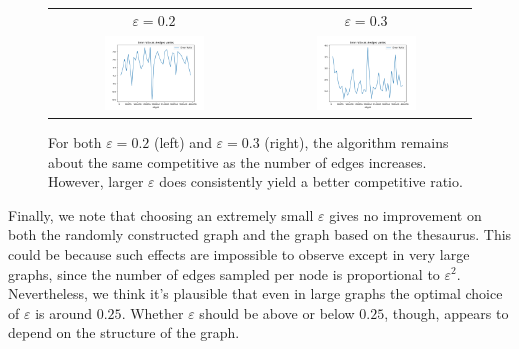 \documentclass[
]{article}
\begin{document}
\begin{figure}[!htb]
  \begin{tabular}{cc}
    {\(\varepsilon  = 0.2\)} & {\(\varepsilon = 0.3\)}                                           \\
    \includegraphics[width=0.5\textwidth]{images/error_ratio_as_edges_varies_eps_equals_0.2.png}
                             &
    \includegraphics[width=0.5\textwidth]{images/error_ratio_as_edges_varies_eps_equals_0.3.png} \\
  \end{tabular}
  \caption{\label{fig:error-ratio-as-edges-varies}
    For both $\varepsilon = 0.2$ (left) and $\varepsilon = 0.3$ (right), the
    algorithm remains about the same competitive as the number of edges
    increases. However, larger $\varepsilon$ does consistently yield
    a better competitive ratio.}
\end{figure}

Finally, we note that choosing an extremely small $\varepsilon$ gives no improvement
on both the randomly constructed graph and the graph based on the thesaurus. This could be
because such effects are impossible to observe except in very large graphs, since the number
of edges sampled per node is proportional to $\varepsilon^2$. Nevertheless, we think it's
plausible that even in large graphs the optimal choice of $\varepsilon$ is around $0.25$.
Whether $\varepsilon$ should be above or below $0.25$, though, appears to depend on the
structure of the graph.
\end{document}
